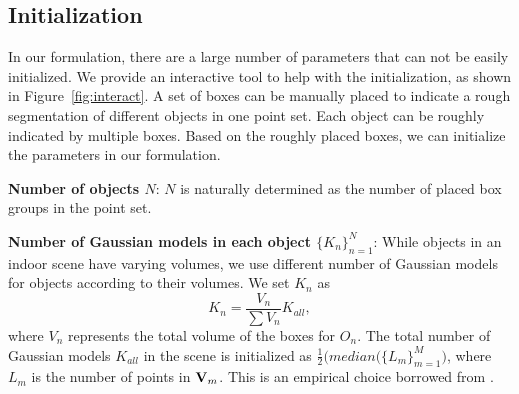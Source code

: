 \subsection{Initialization}
\label{sec:imp:interact}
%
In our formulation, there are a large number of parameters that can not be easily initialized.
%
We provide an interactive tool to help with the initialization, as shown in Figure~\ref{fig:interact}. 
A set of boxes can be manually placed to indicate a rough segmentation of different objects in one point set. 
Each object can be roughly indicated by multiple boxes.
%
Based on the roughly placed boxes, we can initialize the parameters in our formulation. 

\noindent\textbf{Number of objects $N$}: $N$ is naturally determined as the number of placed box groups in the point set.

\noindent\textbf{Number of Gaussian models in each object $\{K_n\}^N_{n=1}$}: While objects in an indoor scene have varying volumes, we use different number of Gaussian models for objects according to their volumes. We set $K_n$ as 
\begin{equation}
\label{equ:K_n}
K_n=\frac{V_n}{\sum V_n}K_{all},
\end{equation}
%
where $V_n$ represents the total volume of the boxes for $O_n$. 
The total number of Gaussian models $K_{all}$ in the scene is initialized as $\frac{1}{2}\big(median(\{L_m\}^M_{m=1}\big)$, where $L_m$ is the number of points in $\mathbf{V}_m$. 
This is an empirical choice borrowed from \cite{Evangelidis2014}.

